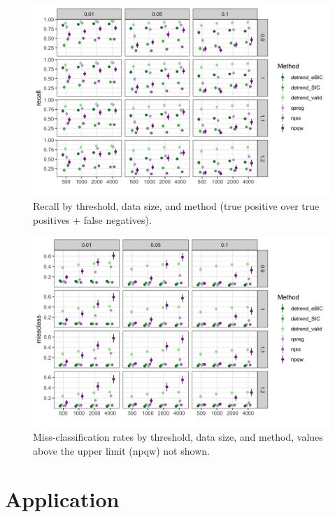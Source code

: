 \documentclass[12pt]{article}
\begin{document}
	\begin{figure}[h!]
		\caption{Recall by threshold, data size, and method (true positive over true positives + false negatives).}
		\includegraphics[width = \linewidth]{Figures/peaks_recall.png}
	\end{figure}

	\begin{figure}[h!]
		\caption{Miss-classification rates by threshold, data size, and method, values above the upper limit (npqw) not shown.}
		\includegraphics[width = \linewidth]{Figures/peaks_missclass.png}
	\end{figure}

	\FloatBarrier
	
	\section{Application}
	
\end{document}
